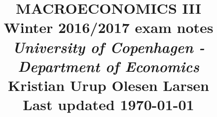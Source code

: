 \documentclass[12pt, a4paper]{article}
\begin{document}
\begin{spacing}{1.213}

\title{ MACROECONOMICS \textbf{III} \\ \Large Winter 2016/2017 exam notes \\ \large \textit{University of Copenhagen - Department of Economics}  \\
\normalsize Kristian Urup Olesen Larsen \\
\normalsize Last updated \today  } %
\date{} %
\maketitle %
\setcounter{page}{1} %


\pagebreak

\tableofcontents
\newpage


\end{spacing}
\end{document}
